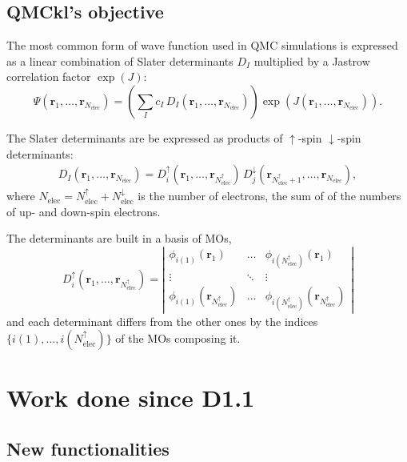 \subsection{QMCkl's objective}

\newcommand{\Nelec}{N_{\text{elec}}}
\newcommand{\Nelecup}{N_{\text{elec}}^\uparrow}
\newcommand{\Nelecdn}{N_{\text{elec}}^\downarrow}
\newcommand{\br}{\mathbf{r}_1,\dots,\mathbf{r}_{\Nelec}}
\newcommand{\brup}{\mathbf{r}_1,\dots,\mathbf{r}_{\Nelec^\uparrow}}
\newcommand{\brdn}{\mathbf{r}_{\Nelec^\uparrow+1},\dots,\mathbf{r}_{\Nelec}}

The most common form of wave function used in \ac{QMC} simulations is
expressed as a linear combination of Slater determinants $D_I$ multiplied by
a Jastrow correlation factor $\exp(J)$:
\begin{equation}
  \Psi(\br) = \left( \sum_I c_I\, D_I(\br) \right) \exp \left( J(\br) \right).
\end{equation}

The Slater determinants are be expressed as products of
$\uparrow$-spin $\downarrow$-spin determinants:
\begin{eqnarray}
D_I(\br) = D_i^\uparrow(\brup)\, D_j^\downarrow(\brdn),
\end{eqnarray}
where $\Nelec = \Nelecup + \Nelecdn$ is the number of
electrons, the sum of of the numbers of up- and down-spin electrons.

The determinants are built in a basis of \acp{MO},
\begin{equation}
  D_i^\uparrow(\brup) = \left|
    \begin{array}{ccc}
      \phi_{i(1)}(\mathbf{r}_1) & \dots & \phi_{i(\Nelecup)}(\mathbf{r}_1) \\
        \vdots & \ddots & \vdots \\
      \phi_{i(1)}(\mathbf{r}_{\Nelecup}) & \dots & \phi_{i(\Nelecup)}(\mathbf{r}_{\Nelecup}) 
    \end{array}
    \right|
\end{equation}
and each determinant differs from the other ones by the indices $\{
i(1), \dots, i(\Nelecup) \}$ of the \acp{MO} composing it.

\section{Work done since D1.1}

\subsection{New functionalities}

